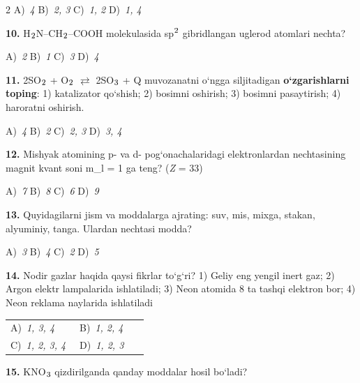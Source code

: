 \documentclass[11pt,a4paper]{article}
\renewcommand{\textsubscript}[1]{\ensuremath{_{\text{\fontsize{8}{8}\selectfont #1}}}}
\renewcommand{\textsuperscript}[1]{\ensuremath{^{\text{\fontsize{8}{8}\selectfont #1}}}}
\begin{document}
\begin{multicols}{2}
\noindent A)~\textsl{4} \hfill B)~\textsl{2, 3} \hfill C)~\textsl{1, 2} \hfill D)~\textsl{1, 4}\par
\vspace{4pt}
\noindent\textbf{10.} H\textsubscript{2}N--CH\textsubscript{2}--COOH molekulasida sp\textsuperscript{2} gibridlangan uglerod atomlari nechta?

\noindent A)~\textsl{2} \hfill B)~\textsl{1} \hfill C)~\textsl{3} \hfill D)~\textsl{4}\par
\vspace{4pt}
\noindent\textbf{11.} 2SO\textsubscript{2} + O\textsubscript{2} $\rightleftarrows$ 2SO\textsubscript{3} + Q muvozanatni o`ngga siljitadigan \textbf{o`zgarishlarni toping}: 1) katalizator qo`shish; 2) bosimni oshirish; 3) bosimni pasaytirish; 4) haroratni oshirish.

\noindent A)~\textsl{4} \hfill B)~\textsl{2} \hfill C)~\textsl{2, 3} \hfill D)~\textsl{3, 4}\par
\vspace{4pt}
\noindent\textbf{12.} Mishyak atomining p- va d- pog`onachalaridagi elektronlardan nechtasining magnit kvant soni m\_l = 1 ga teng? (\textit{Z} = 33)

\noindent A)~\textsl{7} \hfill B)~\textsl{8} \hfill C)~\textsl{6} \hfill D)~\textsl{9}\par
\vspace{4pt}
\noindent\textbf{13.} Quyidagilarni jism va moddalarga ajrating: suv, mis, mixga, stakan, alyuminiy, tanga. Ulardan nechtasi modda?

\noindent A)~\textsl{3} \hfill B)~\textsl{4} \hfill C)~\textsl{2} \hfill D)~\textsl{5}\par
\vspace{4pt}
\noindent\textbf{14.} Nodir gazlar haqida qaysi fikrlar to`g`ri? 1) Geliy eng yengil inert gaz; 2) Argon elektr lampalarida ishlatiladi; 3) Neon atomida 8 ta tashqi elektron bor; 4) Neon reklama naylarida ishlatiladi

\noindent\begin{tabular}{@{}p{0.47\linewidth}@{}p{0.47\linewidth}@{}}
A)~\textsl{1, 3, 4} & B)~\textsl{1, 2, 4} \\
C)~\textsl{1, 2, 3, 4} & D)~\textsl{1, 2, 3} \\
\end{tabular}\par
\vspace{4pt}
\noindent\textbf{15.} KNO\textsubscript{3} qizdirilganda qanday moddalar hosil bo`ladi?


\end{multicols}
\end{document}
